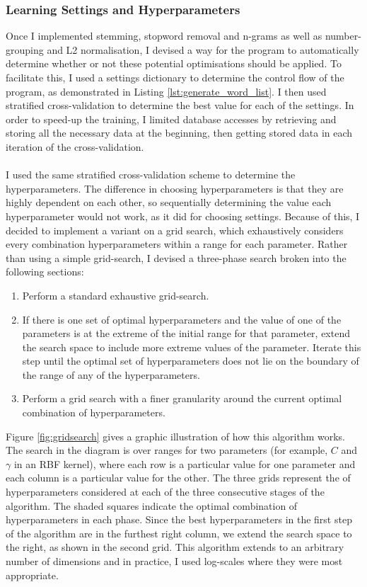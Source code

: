 \documentclass[12pt,a4paper,twoside,openright]{report}
\newcommand{\mylisting}[4]{}
\newcommand{\pylisting}[2]{\mylisting{Python}{py}{#1}{#2}}
\begin{document}
\subsubsection{Learning Settings and Hyperparameters} \label{impl-learning}

Once I implemented stemming, stopword removal and n-grams as well as number-grouping and L2 normalisation, I devised a way for the program to automatically determine whether or not these potential optimisations should be applied. To facilitate this, I used a settings dictionary to determine the control flow of the program, as demonstrated in Listing \ref{lst:generate_word_list}. I then used stratified cross-validation to determine the best value for each of the settings. In order to speed-up the training, I limited database accesses by retrieving and storing all the necessary data at the beginning, then getting stored data in each iteration of the cross-validation.
\\\\
\pylisting{A function which uses given settings to produce a word list of a given text.}{generate_word_list}

I used the same stratified cross-validation scheme to determine the hyperparameters. The difference in choosing hyperparameters is that they are highly dependent on each other, so sequentially determining the value each hyperparameter would not work, as it did for choosing settings. Because of this, I decided to implement a variant on a grid search, which exhaustively considers every combination hyperparameters within a range for each parameter. Rather than using a simple grid-search, I devised a three-phase search broken into the following sections:
\begin{enumerate}
	\item Perform a standard exhaustive grid-search.
	\item If there is one set of optimal hyperparameters and the value of one of the parameters is at the extreme of the initial range for that parameter, extend the search space to include more extreme values of the parameter. Iterate this step until the optimal set of hyperparameters does not lie on the boundary of the range of any of the hyperparameters.
	\item Perform a grid search with a finer granularity around the current optimal combination of hyperparameters.
\end{enumerate}
Figure \ref{fig:gridsearch} gives a graphic illustration of how this algorithm works. The search in the diagram is over ranges for two parameters (for example, $C$ and $\gamma$ in an RBF kernel), where each row is a particular value for one parameter and each column is a particular value for the other. The three grids represent the of hyperparameters considered at each of the three consecutive stages of the algorithm. The shaded squares indicate the optimal combination of hyperparameters in each phase. Since the best hyperparameters in the first step of the algorithm are in the furthest right column, we extend the search space to the right, as shown in the second grid. This algorithm extends to an arbitrary number of dimensions and in practice, I used log-scales where they were most appropriate.
\end{document}
